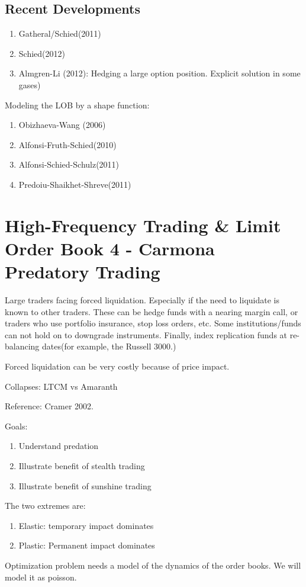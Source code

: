 \section{Recent Developments}
\begin{enumerate}
	\item Gatheral/Schied(2011)
	\item Schied(2012)
	\item Almgren-Li (2012): Hedging a large option position. Explicit solution in some gases)
\end{enumerate}
Modeling the LOB by a shape function:
\begin{enumerate}
	\item Obizhaeva-Wang (2006)
	\item Alfonsi-Fruth-Schied(2010)
	\item Alfonsi-Schied-Schulz(2011)
	\item Predoiu-Shaikhet-Shreve(2011)
\end{enumerate}

\chapter{High-Frequency Trading \& Limit Order Book 4 - Carmona\\Predatory Trading}
Large traders facing forced liquidation.
Especially if the need to liquidate is known to other traders. These can be hedge funds with a nearing margin call, or traders who use portfolio insurance, stop loss orders, etc. Some institutions/funds can not hold on to downgrade instruments. Finally, index replication funds at re-balancing dates(for example, the Russell 3000.)

Forced liquidation can be very costly because of price impact.

Collapses: LTCM vs Amaranth

Reference: Cramer 2002.

Goals:
\begin{enumerate}
	\item Understand predation
	\item Illustrate benefit of stealth trading
	\item Illustrate benefit of sunshine trading
\end{enumerate}

The two extremes are:
\begin{enumerate}
	\item Elastic: temporary impact dominates
	\item Plastic: Permanent impact dominates
\end{enumerate}


Optimization problem needs a model of the dynamics of the order books. We will model it as poisson.














